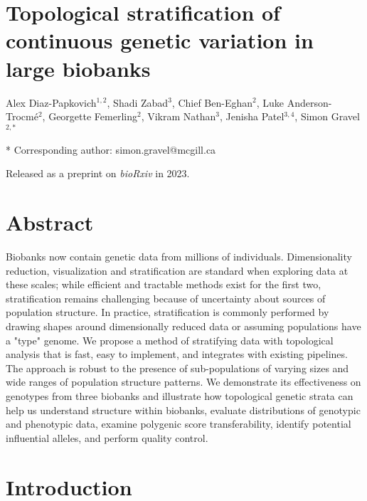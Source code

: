 \section*{Topological stratification of continuous genetic variation in large biobanks}

Alex Diaz-Papkovich$^{1,2}$, Shadi Zabad$^{3}$, Chief Ben-Eghan$^{2}$, Luke Anderson-Trocmé$^{2}$, Georgette Femerling$^{2}$, Vikram Nathan$^{3}$, Jenisha Patel$^{3,4}$, Simon Gravel$^{2,*}$


* Corresponding author: simon.gravel@mcgill.ca

Released as a preprint on \textit{bioRxiv} in 2023.

\section{Abstract}

Biobanks now contain genetic data from millions of individuals. Dimensionality reduction, visualization and stratification are standard when exploring data at these scales; while efficient and tractable methods exist for the first two, stratification remains challenging because of uncertainty about sources of population structure. In practice, stratification is commonly performed by drawing shapes around dimensionally reduced data or assuming populations have a "type" genome. We propose a method of stratifying data with topological analysis that is fast, easy to implement, and integrates with existing pipelines. The approach is robust to the presence of sub-populations of varying sizes and wide ranges of population structure patterns. We demonstrate its effectiveness on genotypes from three biobanks and illustrate how topological genetic strata can help us understand structure within biobanks, evaluate distributions of genotypic and phenotypic data, examine polygenic score transferability, identify potential influential alleles, and perform quality control.

\section{Introduction}

